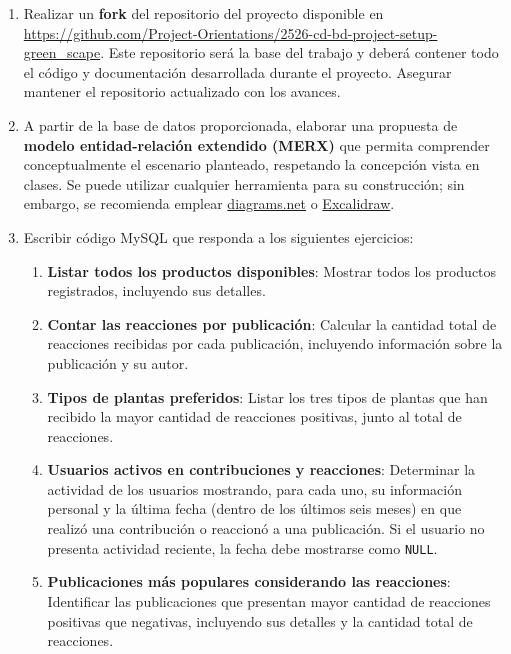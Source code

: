 \documentclass[10pt]{article}
\begin{document}
	\begin{enumerate}
		\item Realizar un \textbf{fork} del repositorio del proyecto disponible en \url{https://github.com/Project-Orientations/2526-cd-bd-project-setup-green_scape}. Este repositorio será la base del trabajo y deberá contener todo el código y documentación desarrollada durante el proyecto. Asegurar mantener el repositorio actualizado con los avances.
		
		\item A partir de la base de datos proporcionada, elaborar una propuesta de  \textbf{modelo entidad-relación extendido (MERX)} que permita comprender conceptualmente el escenario planteado, respetando la concepción vista en clases. 
		Se puede utilizar cualquier herramienta para su construcción; sin embargo, se recomienda emplear 
		\href{https://app.diagrams.net/?src=about}{diagrams.net} o 
		\href{https://excalidraw.com/}{Excalidraw}.
		
		\item Escribir código MySQL que responda a los siguientes ejercicios:
		
		\begin{enumerate}
			\item \textbf{Listar todos los productos disponibles}: Mostrar todos los productos registrados, incluyendo sus detalles.
			
			\item \textbf{Contar las reacciones por publicación}: Calcular la cantidad total de reacciones recibidas por cada publicación, incluyendo información sobre la publicación y su autor.
			
			\item \textbf{Tipos de plantas preferidos}: Listar los tres tipos de plantas que han recibido la mayor cantidad de reacciones positivas, junto al total de reacciones.
			
			\item \textbf{Usuarios activos en contribuciones y reacciones}: Determinar la actividad de los usuarios mostrando, para cada uno, su información personal y la última fecha (dentro de los últimos seis meses) en que realizó una contribución o reaccionó a una publicación. Si el usuario no presenta actividad reciente, la fecha debe mostrarse como \texttt{NULL}.
			
			\item \textbf{Publicaciones más populares considerando las reacciones}: Identificar las publicaciones que presentan mayor cantidad de reacciones positivas que negativas, incluyendo sus detalles y la cantidad total de reacciones.
			

\end{enumerate}
\end{enumerate}
\end{document}
